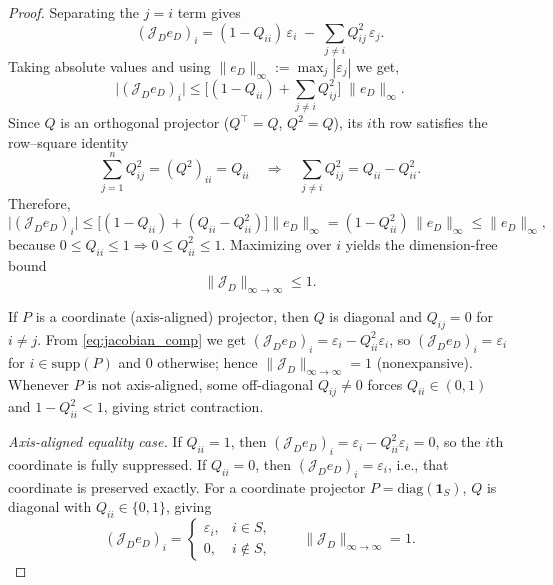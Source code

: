 \documentclass[final,hidelinks,onefignum,onetabnum]{siamart250211}
\providecommand{\1}{\mathbf{1}}
\theoremstyle{plain}
\begin{document}
\begin{proof}
Separating the $j=i$ term gives
\[
(\mathcal{J}_D e_D)_i
=(1-Q_{ii})\,\varepsilon_i \;-\; \sum_{j\neq i} Q_{ij}^2\,\varepsilon_j.
\]
Taking absolute values and using $\|e_D\|_\infty:=\max_j|\varepsilon_j|$ we get,
\[
\big|(\mathcal{J}_D e_D)_i\big|
\le
\Big[(1-Q_{ii})+\sum_{j\neq i}Q_{ij}^2\Big]\;\|e_D\|_\infty.
\]
Since $Q$ is an orthogonal projector ($Q^\top=Q$, $Q^2=Q$), its $i$th row satisfies the row–square identity
\[
\sum_{j=1}^n Q_{ij}^2=(Q^2)_{ii}=Q_{ii}
\quad\Longrightarrow\quad
\sum_{j\neq i}Q_{ij}^2=Q_{ii}-Q_{ii}^2.
\]
Therefore,
\[
\big|(\mathcal{J}_D e_D)_i\big|
\le \big[(1-Q_{ii})+(Q_{ii}-Q_{ii}^2)\big]\|e_D\|_\infty
=(1-Q_{ii}^2)\,\|e_D\|_\infty
\le \|e_D\|_\infty,
\]
because $0\le Q_{ii}\le 1\Rightarrow 0\le Q_{ii}^2\le 1$. Maximizing over $i$ yields the dimension-free bound
\[
\quad \|\mathcal{J}_D\|_{\infty\to\infty}\le 1.\quad
\]

\smallskip
If $P$ is a coordinate (axis-aligned) projector, then $Q$ is diagonal and $Q_{ij}=0$ for $i\neq j$.
From \eqref{eq:jacobian_comp} we get $(\mathcal{J}_D e_D)_i=\varepsilon_i-Q_{ii}^2\varepsilon_i$, so
$(\mathcal{J}_D e_D)_i=\varepsilon_i$ for $i\in \mathrm{supp}(P)$ and $0$ otherwise; hence
$\|\mathcal{J}_D\|_{\infty\to\infty}=1$ (nonexpansive). Whenever $P$ is not axis-aligned, some off-diagonal
$Q_{ij}\neq 0$ forces $Q_{ii}\in(0,1)$ and $1-Q_{ii}^2<1$, giving strict contraction.

\smallskip


\emph{Axis-aligned equality case.}
If $Q_{ii}=1$, then $(\mathcal{J}_D e_D)_i=\varepsilon_i - Q_{ii}^2\varepsilon_i=0$, so the $i$th
coordinate is fully suppressed.  If $Q_{ii}=0$, then $(\mathcal{J}_D e_D)_i=\varepsilon_i$, i.e.,
that coordinate is preserved exactly.  For a coordinate projector
$P=\mathrm{diag}(\mathbf{1}_S)$, $Q$ is diagonal with $Q_{ii}\in\{0,1\}$, giving
\[
(\mathcal{J}_D e_D)_i =
\begin{cases}
\varepsilon_i, & i\in S,\\[3pt]
0, & i\notin S,
\end{cases}
\qquad
\|\mathcal{J}_D\|_{\infty\to\infty}=1.
\]

\end{proof}
\end{document}
